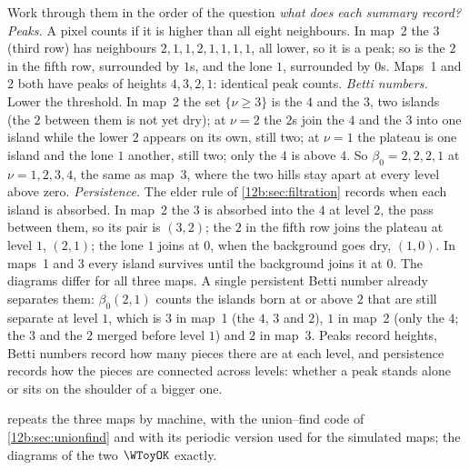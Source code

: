 Work through them in the order of the question \emph{what does each summary record?}
\emph{Peaks.} A pixel counts if it is higher than all eight neighbours. In map~2 the $3$ (third row) has neighbours
$2,1,1,2,1,1,1,1$, all lower, so it is a peak; so is the $2$ in the fifth row, surrounded by $1$s, and the lone $1$,
surrounded by $0$s. Maps~1 and 2 both have peaks of heights $4,3,2,1$: identical peak counts.
\emph{Betti numbers.} Lower the threshold. In map~2 the set $\{\nu\ge3\}$ is the $4$ and the $3$, two islands
(the $2$ between them is not yet dry); at $\nu=2$ the $2$s join the $4$ and the $3$ into one island while the lower
$2$ appears on its own, still two; at $\nu=1$ the plateau is one island and the lone $1$ another, still two; only
the $4$ is above $4$. So $\beta_0=2,2,2,1$ at $\nu=1,2,3,4$, the same as map~3, where the two hills stay apart at
every level above zero.
\emph{Persistence.} The elder rule of \cref{12b:sec:filtration} records when each island is absorbed. In map~2 the
$3$ is absorbed into the $4$ at level $2$, the pass between them, so its pair is $(3,2)$; the $2$ in the fifth row
joins the plateau at level $1$, $(2,1)$; the lone $1$ joins at $0$, when the background goes dry, $(1,0)$. In maps~1
and 3 every island survives until the background joins it at $0$. The diagrams differ for all three maps. A single
persistent Betti number already separates them: $\beta_0(2,1)$ counts the islands born at or above $2$ that are still
separate at level $1$, which is $3$ in map~1 (the $4$, $3$ and $2$), $1$ in map~2 (only the $4$; the $3$ and the $2$
merged before level $1$) and $2$ in map~3. Peaks record heights, Betti numbers record how many pieces there are at
each level, and persistence records how the pieces are connected across levels: whether a peak stands alone or sits
on the shoulder of a bigger one.

 repeats the three maps by machine, with the union--find code of \cref{12b:sec:unionfind} and
with its periodic version used for the simulated maps; the diagrams of the two $\WToyOK$ exactly.

